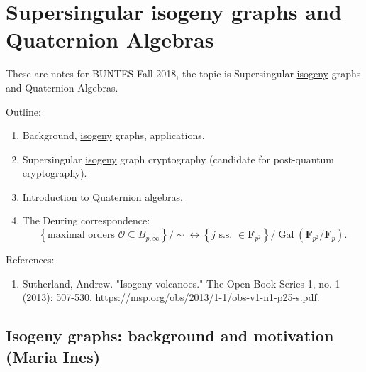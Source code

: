\documentclass[10pt,]{book}
\numberwithin{equation}{section}
\newcommand{\FF}{\mathbf{F}}
\newcommand{\ints}{\mathcal{O}}
\newcommand{\Gal}[2]{\operatorname{Gal}(#1/#2)}
\begin{document}
\chapter[{Supersingular isogeny graphs and Quaternion Algebras}]{Supersingular isogeny graphs and Quaternion Algebras}\label{chapter-supersing-isog}
\hypertarget{p-782}{}%
These are notes for BUNTES Fall 2018, the topic is Supersingular \hyperref[def-supersing-isog-isog]{isogeny} graphs and Quaternion Algebras.%
\par
\hypertarget{p-783}{}%
Outline:\leavevmode%
\begin{enumerate}
\item\hypertarget{li-178}{}Background, \hyperref[def-supersing-isog-isog]{isogeny} graphs, applications.%
\item\hypertarget{li-179}{}Supersingular \hyperref[def-supersing-isog-isog]{isogeny} graph cryptography (candidate for post-quantum cryptography).%
\item\hypertarget{li-180}{}Introduction to Quaternion algebras.%
\item\hypertarget{li-181}{}The Deuring correspondence:%
\begin{equation*}
\left\{ \text{maximal orders }\ints \subseteq B_{p,\infty}\right\}/\sim \leftrightarrow \left\{ j \text{ s.s. }\in \FF_{p^2}\right\}/\Gal{\FF_{p^2}}{\FF_p}\text{.}
\end{equation*}
%
\end{enumerate}
%
\par
\hypertarget{p-784}{}%
References:\leavevmode%
\begin{enumerate}
\item\hypertarget{li-182}{}Sutherland, Andrew. "Isogeny volcanoes." The Open Book Series 1, no. 1 (2013): 507-530. \url{https://msp.org/obs/2013/1-1/obs-v1-n1-p25-s.pdf}.%
\end{enumerate}
%
%
%
\typeout{************************************************}
\typeout{************************************************}
%
\section[{Isogeny graphs: background and motivation (Maria Ines)}]{Isogeny graphs: background and motivation (Maria Ines)}\label{sec-supersing-isog-graphs}
%
%
\typeout{************************************************}
\typeout{************************************************}
%
\end{document}
